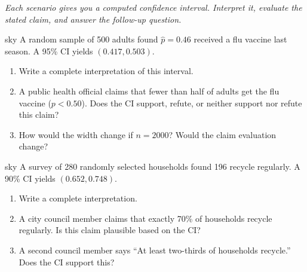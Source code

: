 \documentclass[10pt]{article}
\begin{document}
\namepartnerperiod

\vspace{0.15in}

\textit{Each scenario gives you a computed confidence interval. Interpret it, evaluate the
stated claim, and answer the follow-up question.}

\begin{scenariobox}{sky}
A random sample of 500 adults found $\hat p = 0.46$ received a flu vaccine last season.
A 95\% CI yields $(0.417, 0.503)$.

\begin{enumerate}[label=\alph*.]
  \item Write a complete interpretation of this interval.

  \item A public health official claims that fewer than half of adults get the flu vaccine
        ($p < 0.50$). Does the CI support, refute, or neither support nor refute this claim?

  \item How would the width change if $n=2000$? Would the claim evaluation change?
\end{enumerate}
\end{scenariobox}

\begin{scenariobox}{sky}
A survey of 280 randomly selected households found 196 recycle regularly. A 90\% CI
yields $(0.652, 0.748)$.

\begin{enumerate}[label=\alph*.]
  \item Write a complete interpretation.

  \item A city council member claims that exactly 70\% of households recycle regularly.
        Is this claim plausible based on the CI?

  \item A second council member says ``At least two-thirds of households recycle.''
        Does the CI support this?
\end{enumerate}
\end{scenariobox}
\end{document}
